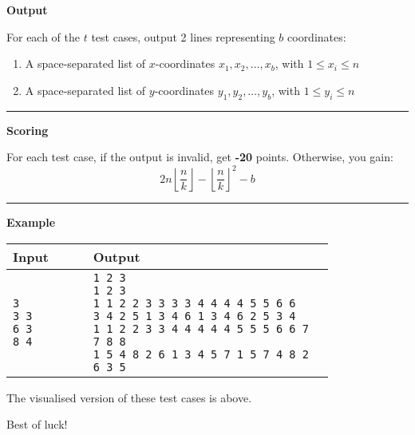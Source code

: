 \textbf{Output}

For each of the $t$ test cases, output 2 lines representing $b$ coordinates:
\begin{enumerate}
    \item A space-separated list of $x$-coordinates $x_1, x_2, \dots, x_b$, with $1 \leq x_i \leq n$
    \item A space-separated list of $y$-coordinates $y_1, y_2, \dots, y_b$, with $1 \leq y_i \leq n$
\end{enumerate}

\vspace{8pt}
\hrule

\textbf{Scoring}

For each test case, if the output is invalid, get \textbf{-20} points. Otherwise, you gain:
\begin{equation*}
    2n \left\lfloor \frac{n}{k} \right\rfloor - \left\lfloor \frac{n}{k} \right\rfloor^2 - b
\end{equation*}

\vspace{8pt}
\hrule

\newpage

\textbf{Example}

\begin{table}[h]
    \centering
    \begin{tabular}{|p{0.2\linewidth}|p{0.6\linewidth}|}
        \hline
        Input & Output \\ \hline
        \texttt{3\newline 
        3 3\newline
        6 3\newline
        8 4\newline}
        &
        \texttt{1 2 3\newline
        1 2 3\newline
        1 1 2 2 3 3 3 3 4 4 4 4 5 5 6 6\newline
        3 4 2 5 1 3 4 6 1 3 4 6 2 5 3 4\newline
        1 1 2 2 3 3 4 4 4 4 4 5 5 5 6 6 7 7 8 8\newline
        1 5 4 8 2 6 1 3 4 5 7 1 5 7 4 8 2 6 3 5\newline}
        \\ \hline
    \end{tabular}
\end{table}

The visualised version of these test cases is above.

Best of luck!
